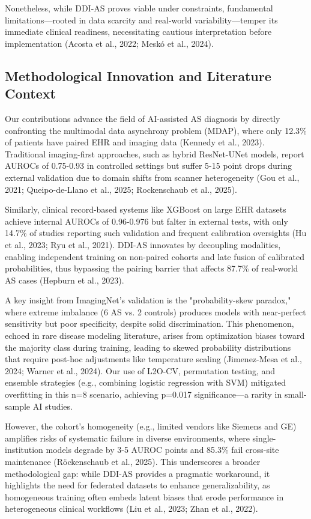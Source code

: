 \documentclass[12pt, a4paper]{article}
\begin{document}
Nonetheless, while DDI-AS proves viable under constraints, fundamental limitations—rooted in data scarcity and real-world variability—temper its immediate clinical readiness, necessitating cautious interpretation before implementation (Acosta et al., 2022; Meskó et al., 2024).

\subsection{Methodological Innovation and Literature Context}
Our contributions advance the field of AI-assisted AS diagnosis by directly confronting the multimodal data asynchrony problem (MDAP), where only 12.3\% of patients have paired EHR and imaging data (Kennedy et al., 2023). Traditional imaging-first approaches, such as hybrid ResNet-UNet models, report AUROCs of 0.75-0.93 in controlled settings but suffer 5-15 point drops during external validation due to domain shifts from scanner heterogeneity (Gou et al., 2021; Queipo-de-Llano et al., 2025; Rockenschaub et al., 2025). 

Similarly, clinical record-based systems like XGBoost on large EHR datasets achieve internal AUROCs of 0.96-0.976 but falter in external tests, with only 14.7\% of studies reporting such validation and frequent calibration oversights (Hu et al., 2023; Ryu et al., 2021). DDI-AS innovates by decoupling modalities, enabling independent training on non-paired cohorts and late fusion of calibrated probabilities, thus bypassing the pairing barrier that affects 87.7\% of real-world AS cases (Hepburn et al., 2023).

A key insight from ImagingNet's validation is the "probability-skew paradox," where extreme imbalance (6 AS vs. 2 controls) produces models with near-perfect sensitivity but poor specificity, despite solid discrimination. This phenomenon, echoed in rare disease modeling literature, arises from optimization biases toward the majority class during training, leading to skewed probability distributions that require post-hoc adjustments like temperature scaling (Jimenez-Mesa et al., 2024; Warner et al., 2024). Our use of L2O-CV, permutation testing, and ensemble strategies (e.g., combining logistic regression with SVM) mitigated overfitting in this n=8 scenario, achieving p=0.017 significance—a rarity in small-sample AI studies. 

However, the cohort's homogeneity (e.g., limited vendors like Siemens and GE) amplifies risks of systematic failure in diverse environments, where single-institution models degrade by 3-5 AUROC points and 85.3\% fail cross-site maintenance (Röckenschaub et al., 2025). This underscores a broader methodological gap: while DDI-AS provides a pragmatic workaround, it highlights the need for federated datasets to enhance generalizability, as homogeneous training often embeds latent biases that erode performance in heterogeneous clinical workflows (Liu et al., 2023; Zhan et al., 2022).
\end{document}
